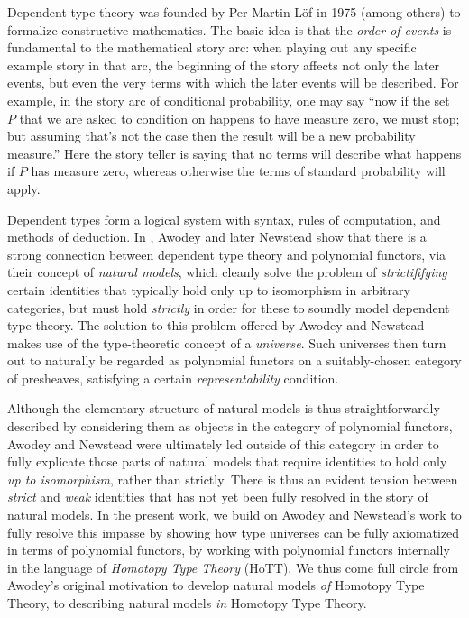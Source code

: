 \documentclass[
  11pt,
  oneside,
  article]{memoir}
\theoremstyle{definition}
\theoremstyle{plain}
\newcommand{\0}{\textsf{0}}
\newcommand{\1}{\tn{\textsf{1}}}
\begin{document}
Dependent type theory \cite{martin-lof1975intuitionistic} was founded by
Per Martin-Löf in 1975 (among others) to formalize constructive
mathematics. The basic idea is that the \emph{order of events} is
fundamental to the mathematical story arc: when playing out any specific
example story in that arc, the beginning of the story affects not only
the later events, but even the very terms with which the later events
will be described. For example, in the story arc of conditional
probability, one may say ``now if the set \(P\) that we are asked to
condition on happens to have measure zero, we must stop; but assuming
that's not the case then the result will be a new probability
measure.'' Here the story teller is saying that no terms will describe
what happens if \(P\) has measure zero, whereas otherwise the terms of
standard probability will apply.

Dependent types form a logical system with syntax, rules of computation,
and methods of deduction. In
\cite{awodey2014natural,awodey2018polynomial}, Awodey and later Newstead
show that there is a strong connection between dependent type theory and
polynomial functors, via their concept of \emph{natural models}, which
cleanly solve the problem of \emph{strictififying} certain identities
that typically hold only up to isomorphism in arbitrary categories, but
must hold \emph{strictly} in order for these to soundly model dependent
type theory. The solution to this problem offered by Awodey and Newstead
makes use of the type-theoretic concept of a \emph{universe}. Such
universes then turn out to naturally be regarded as polynomial functors
on a suitably-chosen category of presheaves, satisfying a certain
\emph{representability} condition.

Although the elementary structure of natural models is thus
straightforwardly described by considering them as objects in the
category of polynomial functors, Awodey and Newstead were ultimately led
outside of this category in order to fully explicate those parts of
natural models that require identities to hold only \emph{up to
isomorphism}, rather than strictly. There is thus an evident tension
between \emph{strict} and \emph{weak} identities that has not yet been
fully resolved in the story of natural models. In the present work, we
build on Awodey and Newstead's work to fully resolve this impasse by
showing how type universes can be fully axiomatized in terms of
polynomial functors, by working with polynomial functors internally in
the language of \emph{Homotopy Type Theory} (HoTT). We thus come full
circle from Awodey's original motivation to develop natural models
\emph{of} Homotopy Type Theory, to describing natural models \emph{in}
Homotopy Type Theory.
\end{document}
